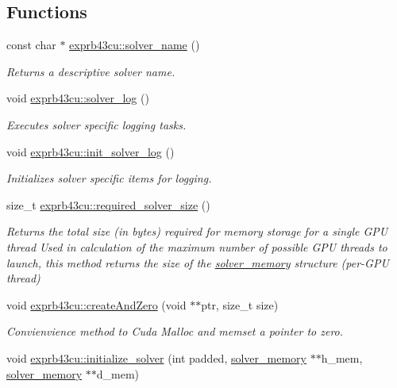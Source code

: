 \subsection*{Functions}
\begin{DoxyCompactItemize}
\item 
const char $\ast$ \hyperlink{namespaceexprb43cu_adb32cc589856026fca36d47f1982ee00}{exprb43cu\+::solver\+\_\+name} ()
\begin{DoxyCompactList}\small\item\em Returns a descriptive solver name. \end{DoxyCompactList}\item 
void \hyperlink{namespaceexprb43cu_a4cf705b7d338850571b92dcae3e1654c}{exprb43cu\+::solver\+\_\+log} ()
\begin{DoxyCompactList}\small\item\em Executes solver specific logging tasks. \end{DoxyCompactList}\item 
void \hyperlink{namespaceexprb43cu_aa82c3608832f5b5891f2f3a992aaf8c7}{exprb43cu\+::init\+\_\+solver\+\_\+log} ()
\begin{DoxyCompactList}\small\item\em Initializes solver specific items for logging. \end{DoxyCompactList}\item 
size\+\_\+t \hyperlink{namespaceexprb43cu_ad837089abb4cfc3819786aad86440da0}{exprb43cu\+::required\+\_\+solver\+\_\+size} ()
\begin{DoxyCompactList}\small\item\em Returns the total size (in bytes) required for memory storage for a single G\+PU thread Used in calculation of the maximum number of possible G\+PU threads to launch, this method returns the size of the \hyperlink{structexprb43cu_1_1solver__memory}{solver\+\_\+memory} structure (per-\/\+G\+PU thread) \end{DoxyCompactList}\item 
void \hyperlink{namespaceexprb43cu_a411c61dc481c439d2a19e8f17ec5af63}{exprb43cu\+::create\+And\+Zero} (void $\ast$$\ast$ptr, size\+\_\+t size)
\begin{DoxyCompactList}\small\item\em Convienvience method to Cuda Malloc and memset a pointer to zero. \end{DoxyCompactList}\item 
void \hyperlink{namespaceexprb43cu_a6c8137b2fd79c625faa2773ea26deb10}{exprb43cu\+::initialize\+\_\+solver} (int padded, \hyperlink{structsolver__memory}{solver\+\_\+memory} $\ast$$\ast$h\+\_\+mem, \hyperlink{structsolver__memory}{solver\+\_\+memory} $\ast$$\ast$d\+\_\+mem)
$$
\end{DoxyCompactItemize}
